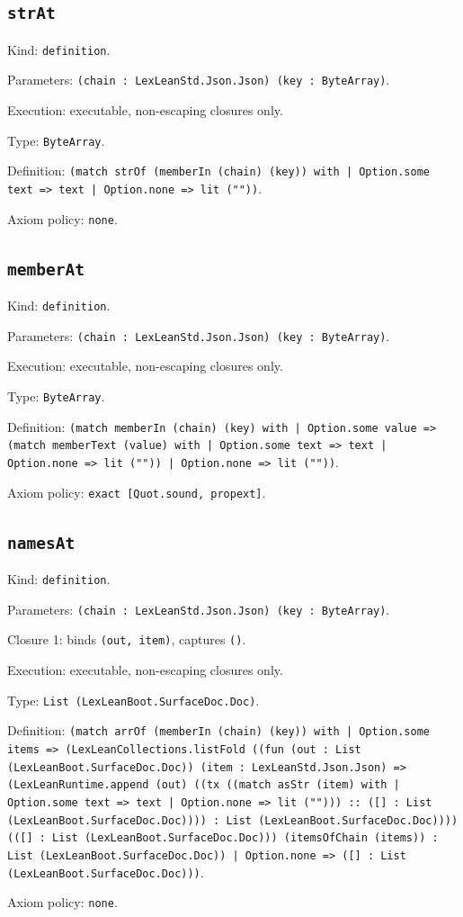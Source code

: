 \documentclass[11pt]{article}
\begin{document}
\subsection*{\texttt{strAt}}
\noindent Kind: \texttt{definition}.\par
\noindent Parameters: \texttt{(chain : LexLeanStd.Json.Json) (key : ByteArray)}.\par
\noindent Execution: executable, non-escaping closures only.\par
\noindent Type: \texttt{ByteArray}.\par
\noindent Definition: \texttt{(match strOf (memberIn (chain) (key)) with | Option.some text => text | Option.none => lit (""))}.\par
\noindent Axiom policy: \texttt{none}.\par
\subsection*{\texttt{memberAt}}
\noindent Kind: \texttt{definition}.\par
\noindent Parameters: \texttt{(chain : LexLeanStd.Json.Json) (key : ByteArray)}.\par
\noindent Execution: executable, non-escaping closures only.\par
\noindent Type: \texttt{ByteArray}.\par
\noindent Definition: \texttt{(match memberIn (chain) (key) with | Option.some value => (match memberText (value) with | Option.some text => text | Option.none => lit ("")) | Option.none => lit (""))}.\par
\noindent Axiom policy: \texttt{exact [Quot.sound, propext]}.\par
\subsection*{\texttt{namesAt}}
\noindent Kind: \texttt{definition}.\par
\noindent Parameters: \texttt{(chain : LexLeanStd.Json.Json) (key : ByteArray)}.\par
\noindent Closure 1: binds \texttt{(out, item)}, captures \texttt{()}.\par
\noindent Execution: executable, non-escaping closures only.\par
\noindent Type: \texttt{List (LexLeanBoot.SurfaceDoc.Doc)}.\par
\noindent Definition: \texttt{(match arrOf (memberIn (chain) (key)) with | Option.some items => (LexLeanCollections.listFold ((fun (out : List (LexLeanBoot.SurfaceDoc.Doc)) (item : LexLeanStd.Json.Json) => (LexLeanRuntime.append (out) ((tx ((match asStr (item) with | Option.some text => text | Option.none => lit (""))) :: ([] : List (LexLeanBoot.SurfaceDoc.Doc)))) : List (LexLeanBoot.SurfaceDoc.Doc)))) (([] : List (LexLeanBoot.SurfaceDoc.Doc))) (itemsOfChain (items)) : List (LexLeanBoot.SurfaceDoc.Doc)) | Option.none => ([] : List (LexLeanBoot.SurfaceDoc.Doc)))}.\par
\noindent Axiom policy: \texttt{none}.\par
\end{document}
